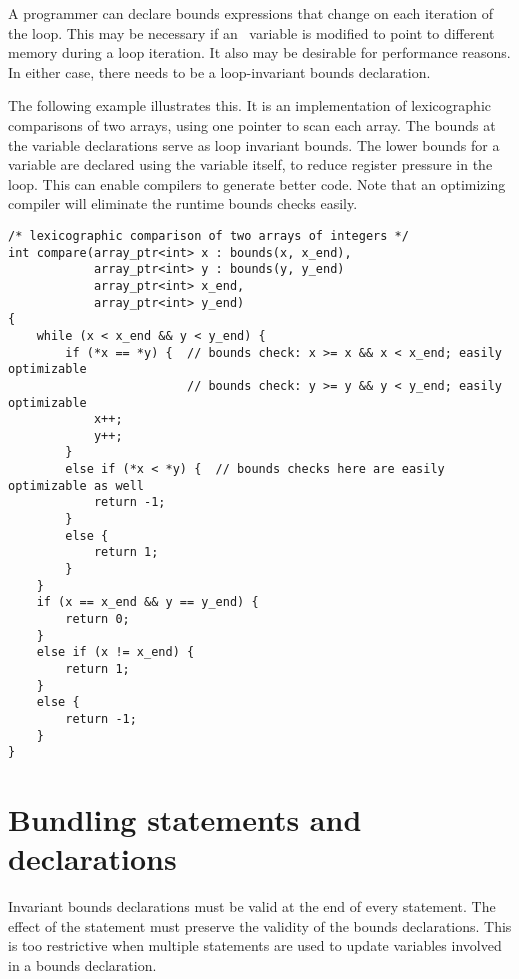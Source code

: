 A programmer can declare bounds expressions that change on each
iteration of the loop. This may be necessary if an \arrayptr\
variable is modified to point to different memory during a loop
iteration. It also may be desirable for performance reasons. In either
case, there needs to be a loop-invariant bounds declaration.

The following example illustrates this. It is an implementation of
lexicographic comparisons of two arrays, using one pointer to scan each
array. The bounds at the variable declarations serve as loop invariant
bounds. The lower bounds for a variable are declared using the variable
itself, to reduce register pressure in the loop. This can enable
compilers to generate better code. Note that an optimizing compiler will
eliminate the runtime bounds checks easily.

\begin{verbatim}
/* lexicographic comparison of two arrays of integers */
int compare(array_ptr<int> x : bounds(x, x_end), 
            array_ptr<int> y : bounds(y, y_end)
            array_ptr<int> x_end,
            array_ptr<int> y_end)
{ 
    while (x < x_end && y < y_end) {
        if (*x == *y) {  // bounds check: x >= x && x < x_end; easily optimizable
                         // bounds check: y >= y && y < y_end; easily optimizable
            x++;
            y++;
        }
        else if (*x < *y) {  // bounds checks here are easily optimizable as well
            return -1;
        }
        else {
            return 1;
        }
    }
    if (x == x_end && y == y_end) {
        return 0;
    }
    else if (x != x_end) {
        return 1;
    }
    else {
        return -1; 
    }
}
\end{verbatim}

\section{Bundling statements and declarations}

Invariant bounds declarations must be valid at the end of every
statement. The effect of the statement must preserve the validity of the
bounds declarations. This is too restrictive when multiple statements
are used to update variables involved in a bounds declaration.

